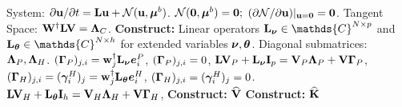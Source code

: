  \begin{algorithm}
	\caption{Extended tangent space ($\ExtL$)}\label{algo:extended_direct_tangent}
	\begin{algorithmic}[0]
		\Require System: $\partial \mathbf{u}/\partial t = \mathbf{L} \mathbf{u} + \mathcal{N}(\mathbf{u},\boldsymbol{\mu}^{b})$.
		\Ensure $\mathcal{N}(\mathbf{0},\boldsymbol{\mu}^{b}) = \mathbf{0};$ $(\partial\mathcal{N}/\partial \mathbf{u})|_{\mathbf{u}=\mathbf{0}} = \mathbf{0}$. 
		\Require Tangent Space: $\mathbf{W}^{\dagger}\mathbf{L} \mathbf{V} = \mathbf{\Lambda}_{C}$.
		\State \textbf{Construct:} Linear operators $\Lnu\in\mathds{C}^{N\times p}$ and $\Ltheta\in\mathds{C}^{N\times h}$ for extended variables $\boldsymbol{\nu},\boldsymbol{\theta}$. 
		\Require Diagonal submatrices: $\mathbf{\Lambda}_{P},\mathbf{\Lambda}_{H}$.
					\State $(\mathbf{\Gamma}_{P})_{j,i} = \mathbf{w}^{\dagger}_{j}\mathbf{L}_{\boldsymbol{\nu}}\boldsymbol{e}^{P}_{i}$,
				\Else
					\State $(\mathbf{\Gamma}_{P})_{j,i} = 0$,
				\EndIf
			\EndFor
		\EndFor
		\State{}
		\State $\mathbf{L}\mathbf{V}_{P} + \mathbf{L}_{\boldsymbol{\nu}}\mathbf{I}_{p} = \mathbf{V}_{P}\mathbf{\Lambda}_{P} + \mathbf{V}\mathbf{\Gamma}_{P}$, 
					\State $(\mathbf{\Gamma}_{H})_{j,i} = (\boldsymbol{\gamma}^{H}_{i})_{j} = \mathbf{w}^{\dagger}_{j}\mathbf{L}_{\boldsymbol{\theta}}\boldsymbol{e}^{H}_{i}$,
				\Else
					\State $(\mathbf{\Gamma}_{H})_{j,i} = (\boldsymbol{\gamma}^{H}_{i})_{j} = 0$.
				\EndIf
			\EndFor
		\EndFor
		\State{}
		\State $\mathbf{L}\mathbf{V}_{H} + \mathbf{L}_{\boldsymbol{\theta}}\mathbf{I}_{h} = \mathbf{V}_{H}\mathbf{\Lambda}_{H} + \mathbf{V}\mathbf{\Gamma}_{H}$, 
		\State \textbf{Construct:} $\widehat{\mathbf{V}}$ 
		\State \textbf{Construct:} $\mathbf{\widehat{K}}$ 
		
		\State {}
	\end{algorithmic}
\end{algorithm}

